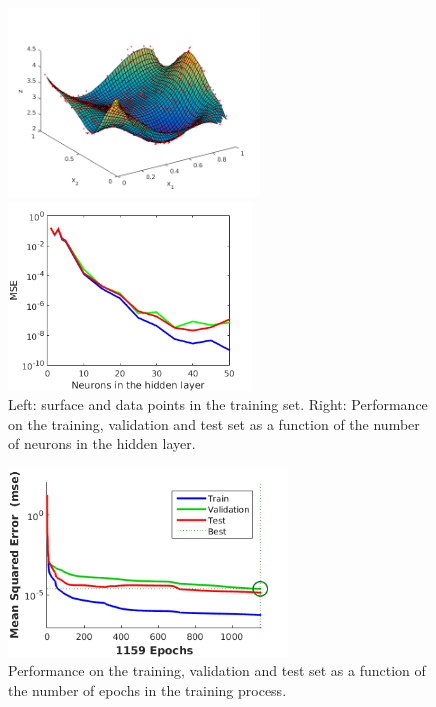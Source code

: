 \documentclass[pdftex,12pt,a4paper]{article}
\begin{document}
\begin{figure}[tbh]
\centering
\begin{minipage}{0.4\textwidth}
\includegraphics[height=5cm]{figs/train_surface.png}
\end{minipage}\quad
\begin{minipage}{0.4\textwidth}
\includegraphics[height=5cm]{figs/performance_val.png}
\end{minipage}
\caption{Left: surface and data points in the training set. Right: Performance on the training, validation and test set as a function of the number of neurons in the hidden layer. \label{fig:performance_val}}
\end{figure}

\begin{figure}[tbh]
\centering
\includegraphics[height=5cm]{figs/MSE_final.png}
\caption{Performance on the training, validation and test set as a function of the number of epochs in the training process. \label{fig:MSE_final}}
\end{figure}
\end{document}
